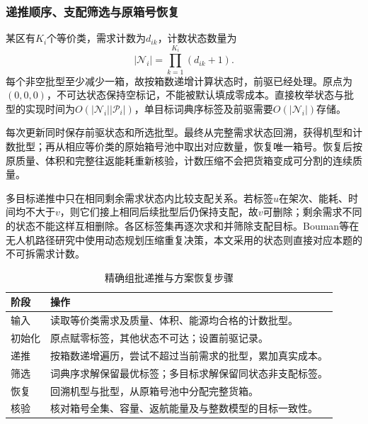 \subsubsection{递推顺序、支配筛选与原箱号恢复}
某区有$K_i$个等价类，需求计数为$d_{ik}$，计数状态数量为
\begin{equation}
|\mathcal N_i|=\prod_{k=1}^{K_i}(d_{ik}+1).
\label{eq:q1_dp_states}
\end{equation}
每个非空批型至少减少一箱，故按箱数递增计算状态时，前驱已经处理。原点为$(0,0,0)$，不可达状态保持空标记，不能被默认填成零成本。直接枚举状态与批型的实现时间为$O(|\mathcal N_i||\mathcal P_i|)$，单目标词典序标签及前驱需要$O(|\mathcal N_i|)$存储。

每次更新同时保存前驱状态和所选批型。最终从完整需求状态回溯，获得机型和计数批型；再从相应等价类的原始箱号池中取出对应数量，恢复唯一箱号。恢复后按原质量、体积和完整往返能耗重新核验，计数压缩不会把货箱变成可分割的连续质量。

多目标递推中只在相同剩余需求状态内比较支配关系。若标签$u$在架次、能耗、时间均不大于$v$，则它们接上相同后续批型后仍保持支配，故$v$可删除；剩余需求不同的状态不能这样互相删除。各区标签集再逐次求和并筛除支配目标。Bouman等在无人机路径研究中使用动态规划压缩重复决策\cite{bouman2018}，本文采用的状态则直接对应本题的不可拆需求计数。

\begin{table}[htbp]\centering\small
\caption{精确组批递推与方案恢复步骤}\label{tab:dp_execution}
\begin{tabularx}{\linewidth}{p{1.5cm}L}\toprule
阶段 & 操作\\\midrule
输入 & 读取等价类需求及质量、体积、能源均合格的计数批型。\\
初始化 & 原点赋零标签，其他状态不可达；设置前驱记录。\\
递推 & 按箱数递增遍历，尝试不超过当前需求的批型，累加真实成本。\\
筛选 & 词典序求解保留最优标签；多目标求解保留同状态非支配标签。\\
恢复 & 回溯机型与批型，从原箱号池中分配完整货箱。\\
核验 & 核对箱号全集、容量、返航能量及与整数模型的目标一致性。\\\bottomrule
\end{tabularx}
\end{table}

